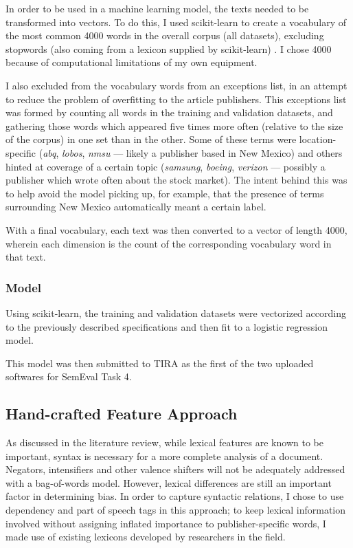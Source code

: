\documentclass[11pt, a4paper]{article}
\begin{document}
In order to be used in a machine learning model, the texts needed to be transformed into vectors. To do this, I used scikit-learn to create a vocabulary of the most common 4000 words in the overall corpus (all datasets), excluding stopwords (also coming from a lexicon supplied by scikit-learn) \cite{scikit-learn}. I chose 4000 because of computational limitations of my own equipment.

I also excluded from the vocabulary words from an exceptions list, in an attempt to reduce the problem of overfitting to the article publishers. This exceptions list was formed by counting all words in the training and validation datasets, and gathering those words which appeared five times more often (relative to the size of the corpus) in one set than in the other. Some of these terms were location-specific (\textit{abq}, \textit{lobos}, \textit{nmsu} --- likely a publisher based in New Mexico) and others hinted at coverage of a certain topic (\textit{samsung}, \textit{boeing}, \textit{verizon} --- possibly a publisher which wrote often about the stock market). The intent behind this was to help avoid the model picking up, for example, that the presence of terms surrounding New Mexico automatically meant a certain label.

With a final vocabulary, each text was then converted to a vector of length 4000, wherein each dimension is the count of the corresponding vocabulary word in that text.

\subsubsection{Model}

Using scikit-learn, the training and validation datasets were vectorized according to the previously described specifications and then fit to a logistic regression model. 

This model was then submitted to TIRA as the first of the two uploaded softwares for SemEval Task 4.

\subsection{Hand-crafted Feature Approach}

As discussed in the literature review, while lexical features are known to be important, syntax is necessary for a more complete analysis of a document. Negators, intensifiers and other valence shifters will not be adequately addressed with a bag-of-words model. However, lexical differences are still an important factor in determining bias. In order to capture syntactic relations, I chose to use dependency and part of speech tags in this approach; to keep lexical information involved without assigning inflated importance to publisher-specific words, I made use of existing lexicons developed by researchers in the field.
\end{document}
